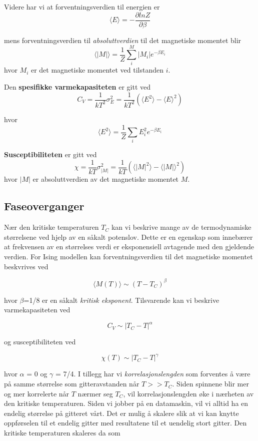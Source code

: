 \documentclass[11pt,a4paper]{article}
\begin{document}
Videre har vi at forventningsverdien til energien er 
\begin{equation}
\langle E \rangle = - \frac{\partial lnZ}{\partial \beta} 
\end{equation}

mens forventningsverdien til \textit{absoluttverdien} til det magnetiske momentet blir
\begin{equation}
\langle |M| \rangle = \frac{1}{Z} \sum_i^M |M_i| e^{-\beta E_i}
\end{equation}
hvor $M_i$ er det magnetiske momentet ved tilstanden $i$.


Den \textbf{spesifikke varmekapasiteten} er gitt ved
\begin{equation}
C_V = \frac{1}{kT^2}\sigma_E^2 = \frac{1}{kT^2}(\langle E^2 \rangle - \langle E \rangle^2 )
\end{equation}

hvor 
\begin{equation}
\langle E^2 \rangle = \frac{1}{Z} \sum_i E_i^2 e^{- \beta E_i}
\end{equation}

\textbf{Susceptibiliteten} er gitt ved
\begin{equation}
\chi = \frac{1}{kT} \sigma_{|M|}^2 = \frac{1}{kT}( \langle |M|^2 \rangle - \langle |M| \rangle^2 )
\end{equation}
hvor $|M |$ er absoluttverdien av det magnetiske momentet $M$.

\subsection{Faseoverganger}
Nær den kritiske temperaturen $T_C$ kan vi beskrive mange av de termodynamiske størrelsene ved hjelp av en såkalt potenslov. Dette er en egenskap som innebærer at frekvensen av en størrelses verdi er eksponensiell avtagende med den gjeldende verdien. For Ising modellen kan forventningsverdien til det magnetiske momentet beskvrives ved

\[ \langle M(T) \rangle \sim (T - T_C)^\beta \]

hvor $\beta$=1/8 er en såkalt \textit{kritisk eksponent}. Tilsvarende kan vi beskrive varmekapasiteten ved

\[ C_V \sim |T_C - T|^\alpha \]

og susceptibiliteten ved

\[ \chi(T) \sim |T_C - T|^\gamma  \]

hvor $\alpha$ = 0 og $\gamma$ = 7/4. I tillegg har vi \textit{korrelasjonslengden} som forventes å være på samme størrelse som gitteravstanden når $T >> T_C$. Siden spinnene blir mer og mer korrelerte når $T$ nærmer seg $T_C$, vil korrelasjonslengden øke i nærheten av den kritiske temperaturen. Siden vi jobber på en datamaskin, vil vi alltid ha en endelig størrelse på gitteret vårt. Det er mulig å skalere slik at vi kan knytte oppførselen til  et endelig gitter med resultatene til et uendelig stort gitter. Den kritiske temperaturen skaleres da som
\end{document}
